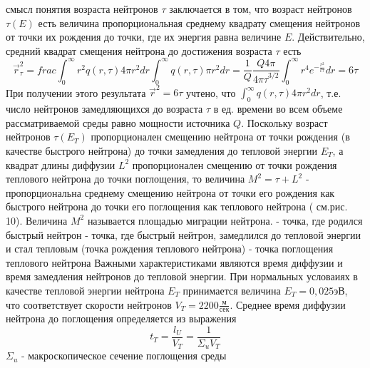 \documentclass[a4paper]{article}
\begin{document}
    смысл понятия возраста нейтронов $\tau$ заключается в том, что
    возраст нейтронов $\tau(E)$ есть величина пропорциональная среднему
    квадрату смещения нейтронов от точки их рождения до точки, где
    их энергия равна величине $E$. Действительно, средний квадрат
    смещения нейтрона до достижения возраста $\tau$ есть
    \begin{equation}
        \overrightarrow{r}_{\tau}^2 =
        frac{\int_0^{\infty}r^2 q(r, \tau)4\pi r^2 dr}
        {\int_0^{\infty}q(r,\tau)\pi r^2 dr} =
        \frac{1}{Q}\frac{Q4\pi}{{4\pi\tau}^{3/2}}
        \int_0^\infty r^4 e^{-\frac{r^2}{t\tau}}dr = 6\tau
    \end{equation}
    При получении этого результата \(\overrightarrow{r}^2 = 6\tau\)
    учтено, что \(\int_0^\infty q(r,\tau)4\pi r^2 dr\), т.е. число
    нейтронов замедляющихся до возраста $\tau$ в ед. времени во всем
    объеме рассматриваемой среды равно мощности источника $Q$.
    Поскольку возраст нейтронов $\tau(E_T)$ пропорционален смещению
    нейтрона от точки рождения (в качестве быстрого нейтрона) до
    точки замедления до тепловой энергии $E_T$, а квадрат длины
    диффузии $L^2$ пропорционален смещению от точки рождения
    теплового нейтрона до точки поглощения, то величина 
    \(M^2 = \tau + L^2\) - пропорциональна среднему смещению нейтрона
    от точки его рождения как быстрого нейтрона до точки его
    поглощения как теплового нейтрона ( см.рис. 10). Величина
    $M^2$ называется площадью миграции нейтрона.
     - точка, где родился быстрый нейтрон
     - точка, где быстрый нейтрон, замедлился до тепловой
    энергии и стал тепловым (точка рождения теплового нейтрона)
     - точка поглощения теплового нейтрона
    \newline
    Важными характеристиками являются время диффузии и время
    замедления нейтронов до тепловой энергии. При нормальных условаиях
    в качестве тепловой энергии нейтрона $E_T$ принимается величина
    \(E_T=0,025\text{эВ}\), что соответствует скорости нейтронов
    \(V_T=2200\frac{\text{м}}{\text{сек}}\).
    \newline
    Среднее время диффузии нейтрона до поглощения определяется из
    выражения
    \begin{equation}\label{e_27}\tag{27}
        t_T=\frac{l_U}{V_T}=\frac{1}{\Sigma_u V_T}
    \end{equation}
    $\Sigma_u$ - макроскопическое сечение поглощения среды
\end{document}
